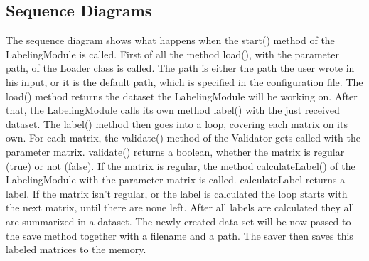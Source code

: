 \documentclass[parskip=full]{scrartcl}
\begin{document}
\subsection{Sequence Diagrams}
The sequence diagram shows what happens when the start() method of the LabelingModule is called.
First of all the method load(), with the parameter path, of the Loader class is called.
The path is either the path the user wrote in his input, or it is the default path, which is specified in the configuration file.
The load() method returns the dataset the LabelingModule will be working on.
After that, the LabelingModule calls its own method label() with the just received dataset.
The label() method then goes into a loop, covering each matrix on its own.
For each matrix, the validate() method of the Validator gets called with the parameter matrix. validate() returns a boolean, whether the matrix is regular (true) or not (false).
If the matrix is regular, the method calculateLabel() of the LabelingModule with the parameter matrix is called. calculateLabel returns a \gls{label}.
If the matrix isn't regular, or the \gls{label} is calculated the loop starts with the next matrix, until there are none left.
After all \glspl{label} are calculated they all are summarized in a dataset.
The newly created data set will be now passed to the save method together with a filename and a path.
The saver then saves this labeled matrices to the memory.

\newpage
\begin{figure}[h]
\begin{center}

\label{Activity Diagrams}
\end{center}
\end{figure}
\newpage
\end{document}
